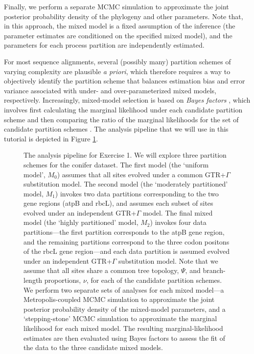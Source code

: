 Finally, we perform a separate MCMC simulation to approximate the joint posterior probability density of the phylogeny and other parameters.  Note that, in this approach, the mixed model is a fixed assumption of the inference (\IE the parameter estimates are conditioned on the specified mixed model), and the parameters for each process partition are independently estimated.

For most sequence alignments, several (possibly many) partition schemes of varying complexity are plausible {\it a priori}, which therefore requires a way to objectively identify the partition scheme that balances estimation bias and error variance associated with under- and over-parameterized mixed models, respectively.
Increasingly, mixed-model selection is based on \textit{Bayes factors} \citep[{\it e.g.},][]{suchard01}, which involves first calculating the marginal likelihood under each candidate partition scheme and then comparing the ratio of the marginal likelihoods for the set of candidate partition schemes \citep{brandley05,nylander04,mcguire07}.
The analysis pipeline that we will use in this tutorial is depicted in Figure \ref{pipeline}.
\begin{figure}[h!]
\centering
{}
\caption{\small The analysis pipeline for Exercise 1. We will explore three partition schemes for the conifer dataset.
The first model (the `uniform model', $M_0$) assumes that all sites evolved under a common GTR+$\Gamma$ substitution model.
The second model (the `moderately partitioned' model, $M_1$) invokes two data partitions corresponding to the two gene regions (atpB and rbcL), and assumes each subset of sites evolved under an independent GTR+$\Gamma$ model.
The final mixed model (the `highly partitioned' model, $M_2$) invokes four data partitions---the first partition corresponds to the atpB gene region, and the remaining partitions correspond to the three codon positons of the rbcL gene region---and each data partition is assumed evolved under an independent GTR+$\Gamma$ substitution model.
Note that we assume that all sites share a common tree topology, $\Psi$, and branch-length proportions, $\nu$, for each of the candidate partition schemes.
We perform two separate sets of analyses for each mixed model---a Metropolis-coupled MCMC simulation to approximate the joint posterior probability density of the mixed-model parameters, and a `stepping-stone' MCMC simulation to approximate the marginal likelihood for each mixed model.
The resulting marginal-likelihood estimates are then evaluated using Bayes factors to assess the fit of the data to the three candidate mixed models.  
}
\label{pipeline}
\end{figure}
 




